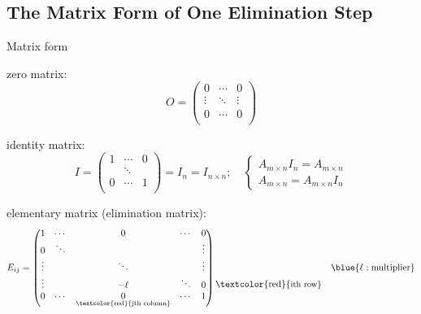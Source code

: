 \subsection{The Matrix Form of One Elimination Step}

\begin{definition*}[1B]
    Matrix form
    \begin{definition}
        zero matrix:
        \[
        O = \left(\begin{matrix}
        0 & \cdots & 0 \\
        \vdots & \ddots & \vdots \\
        0 & \cdots & 0 \\
        \end{matrix}\right)
        \]
    \end{definition}

    \begin{definition}
        identity matrix: 
        \[
        I = \left(\begin{matrix}
        1 & \cdots & 0 \\
         & \ddots &  \\
        0 & \cdots & 1 \\
        \end{matrix}\right) = I_n = I_{n\times n}; \quad \begin{cases}
            A_{m\times n} I_{n} = A_{m\times n} \\
            A_{m\times n} = A_{m\times n}I_{n}
        \end{cases}
        \]
    \end{definition}

    \begin{definition}
     elementary matrix (elimination matrix):
        \[
        E_{ij} = \left(\begin{matrix}
        1 & \cdots & 0 & \cdots & 0 \\
        0 & \ddots &  & & \vdots\\
        \vdots &  & \ddots & &\vdots \\
        \vdots &  & -\ell & \ddots& 0\\
        0 & \cdots & \underset{\text{\textcolor{red}{jth column}}}{0}  & \cdots & 1\\
        \end{matrix}\right)\begin{matrix}
            \\ \\ \\ \text{\textcolor{red}{\small ith row}} \\
        \end{matrix} \quad \blue{\ell: \text{multiplier}}
        \]


\end{definition}
\end{definition*}
